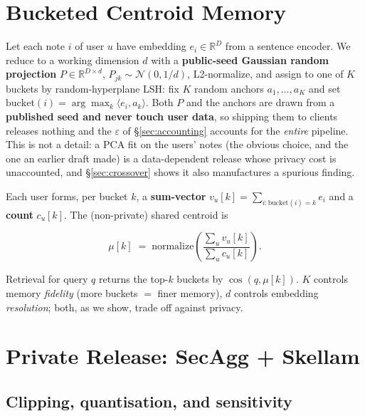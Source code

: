 \documentclass[pdflatex,sn-mathphys-num,iicol]{sn-jnl}
\theoremstyle{thmstyleone}%
\theoremstyle{thmstyletwo}%
\theoremstyle{thmstylethree}%
\newcommand{\eps}{\varepsilon}
\newcommand{\R}{\mathbb{R}}
\newcommand{\secref}[1]{\S\ref{#1}}
\begin{document}
\section{Bucketed Centroid Memory}\label{sec:centroid}

Let each note $i$ of user $u$ have embedding $e_i \in \R^{D}$ from a sentence
encoder. We reduce to a working dimension $d$ with a \textbf{public-seed Gaussian
random projection} $P \in \R^{D \times d}$, $P_{jk} \sim \mathcal{N}(0, 1/d)$,
L2-normalize, and assign to one of $K$ buckets by random-hyperplane LSH: fix $K$
random anchors $a_1, \dots, a_K$ and set
$\mathrm{bucket}(i) = \arg\max_k \langle e_i, a_k \rangle$. Both $P$ and the
anchors are drawn from a \textbf{published seed and never touch user data}, so
shipping them to clients releases nothing and the $\eps$ of
\secref{sec:accounting} accounts for the \emph{entire} pipeline. This is not a
detail: a PCA fit on the users' notes (the obvious choice, and the one an
earlier draft made) is a data-dependent release whose privacy cost is
unaccounted, and \secref{sec:crossover} shows it also manufactures a spurious
finding.

Each user forms, per bucket $k$, a \textbf{sum-vector}
$v_u[k] = \sum_{i : \mathrm{bucket}(i) = k} e_i$ and a \textbf{count} $c_u[k]$.
The (non-private) shared centroid is

\begin{equation}\label{eq:centroid}
  \mu[k] \;=\; \mathrm{normalize}\!\left(
    \frac{\sum_u v_u[k]}{\sum_u c_u[k]}
  \right).
\end{equation}

Retrieval for query $q$ returns the top-$k$ buckets by $\cos(q, \mu[k])$. $K$
controls memory \emph{fidelity} (more buckets $=$ finer memory), $d$ controls
embedding \emph{resolution}; both, as we show, trade off against privacy.

\section{Private Release: SecAgg + Skellam}\label{sec:release}

\subsection{Clipping, quantisation, and sensitivity}\label{sec:clipping}
\end{document}
